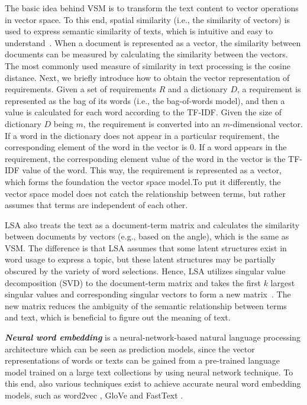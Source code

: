 \documentclass[graybox]{svmult}
\newcommand{\myparagraph}[1]{\noindent\emph{\textbf{#1}}}
\begin{document}
The basic idea behind VSM is to transform the text content to vector operations in vector space. To this end, spatial similarity (i.e., the similarity of vectors) is used to express semantic similarity of texts, which is intuitive and easy to understand~\cite{SaltonWY75}. When a document is represented as a vector, the similarity between documents can be measured by calculating the similarity between the vectors. The most commonly used measure of similarity in text processing is the cosine distance. Next, we briefly introduce how to obtain the vector representation of requirements. Given a set of requirements $R$ and a dictionary $D$, a requirement is represented as the bag of its words (i.e., the bag-of-words model), and then a value is calculated for each word according to the TF-IDF.
Given the size of dictionary $D$ being $m$, the requirement is converted into an $m$-dimensional vector. If a word in the dictionary does not appear in a particular requirement, the corresponding element of the word in the vector is 0. If a word appears in the requirement, the corresponding element value of the word in the vector is the TF-IDF value of the word. This way, the requirement is represented as a vector, which forms the foundation the vector space model.To put it differently, the vector space model does not catch the relationship between terms, but rather assumes that terms are independent of each other.

LSA also treats the text as a document-term matrix and calculates the similarity between documents by vectors (e.g., based on the angle), which is the same as VSM. The difference is that LSA assumes that some latent structures exist in word usage to express a topic, but these latent structures may be partially obscured by the variety of word selections. Hence, LSA utilizes singular value decomposition (SVD) to the document-term matrix and takes the first $k$ largest singular values and corresponding singular vectors to form a new matrix~\cite{Dumais04}. The new matrix reduces the ambiguity of the semantic relationship between terms and text, which is beneficial to figure out the meaning of text.

\myparagraph{Neural word embedding} is a neural-network-based natural language processing architecture which can be seen as prediction models, since the vector representations of words or texts can be gained from a pre-trained language model trained on a large text collections by using neural network technique. To this end, also various techniques exist to achieve accurate neural word embedding models, such as word2vec \cite{MikolovSCCD13}, GloVe \cite{PenningtonSM14} and FastText \cite{BojanowskiGJM16}.
\end{document}
